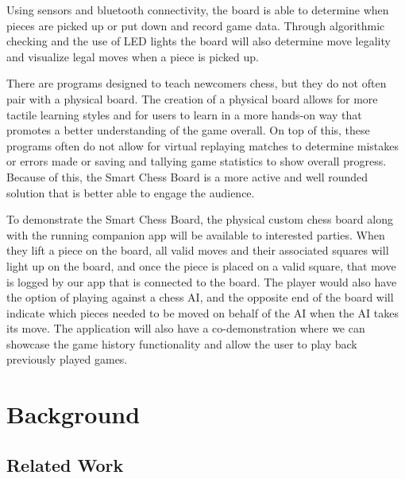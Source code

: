 \documentclass[11pt,journal]{IEEEtran}
\begin{document}
Using sensors and bluetooth connectivity, the board is able to determine when pieces are picked up or put down and record game data. Through algorithmic checking and the use of LED lights the board will also determine move legality and visualize legal moves when a piece is picked up.

There are programs designed to teach newcomers chess, but they do not often pair with a physical board. The creation of a physical board allows for more tactile learning styles and for users to learn in a more hands-on way that promotes a better understanding of the game overall. On top of this, these programs often do not allow for virtual replaying matches to determine mistakes or errors made or saving and tallying game statistics to show overall progress. Because of this, the Smart Chess Board is a more active and well rounded solution that is better able to engage the audience.



To demonstrate the Smart Chess Board, the physical custom chess board along with the running companion app will be available to interested parties. When they lift a piece on the board, all valid moves and their associated squares will light up on the board, and once the piece is placed on a valid square, that move is logged by our app that is connected to the board. The player would also have the option of playing against a chess AI, and the opposite end of the board will indicate which pieces needed to be moved on behalf of the AI when the AI takes its move. The application will also have a co-demonstration where we can showcase the game history functionality and allow the user to play back previously played games.

\section{Background}



\subsection{Related Work}
\end{document}
